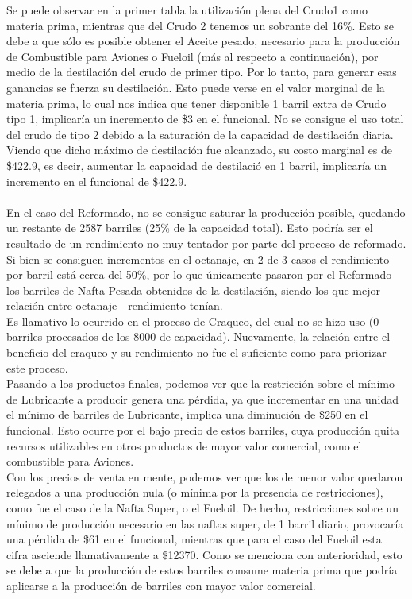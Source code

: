 \documentclass[a4paper,10pt]{article}
\begin{document}
Se puede observar en la primer tabla la utilizaci\'on plena del Crudo1 como materia prima, mientras que del Crudo 2 tenemos un sobrante del 16\%. Esto se debe a que s\'olo es posible obtener el Aceite pesado, necesario para la producci\'on de Combustible para Aviones o Fueloil (m\'as al respecto a continuaci\'on), por medio de la destilaci\'on del crudo de primer tipo. Por lo tanto, para generar esas ganancias se fuerza su destilaci\'on. Esto puede verse en el valor marginal de la materia prima, lo cual nos indica que tener disponible 1 barril extra de Crudo tipo 1, implicar\'ia un incremento de \$3 en el funcional.
No se consigue el uso total del crudo de tipo 2 debido a la saturaci\'on de la capacidad de destilaci\'on diaria.
Viendo que dicho m\'aximo de destilaci\'on fue alcanzado, su costo marginal es de \$422.9, es decir, aumentar la capacidad de destilaci\'o en 1 barril, implicar\'ia un incremento en el funcional de \$422.9. 
\\
\\
En el caso del Reformado, no se consigue saturar la producci\'on posible, quedando un restante de 2587 barriles (25\% de la capacidad total). Esto podr\'ia ser el resultado de un rendimiento no muy tentador por parte del proceso de reformado. Si bien se consiguen incrementos en el octanaje, en 2 de 3 casos el rendimiento por barril está cerca del 50\%, por lo que \'unicamente pasaron por el Reformado los barriles de Nafta Pesada obtenidos de la destilaci\'on, siendo los que mejor relaci\'on entre octanaje - rendimiento ten\'ian.
\\
Es llamativo lo ocurrido en el proceso de Craqueo, del cual no se hizo uso (0 barriles procesados de los 8000 de capacidad). Nuevamente, la relaci\'on entre el beneficio del craqueo y su rendimiento no fue el suficiente como para priorizar este proceso. 
\\

Pasando a los productos finales, podemos ver que la restricci\'on sobre el m\'inimo de Lubricante a producir genera una p\'erdida, ya que incrementar en una unidad el m\'inimo de barriles de Lubricante, implica una diminuci\'on de \$250 en el funcional. Esto ocurre por el bajo precio de estos barriles, cuya producci\'on quita recursos utilizables en otros productos de mayor valor comercial, como el combustible para Aviones.
\\

Con los precios de venta en mente, podemos ver que los de menor valor quedaron relegados a una producci\'on nula (o m\'inima por la presencia de restricciones), como fue el caso de la Nafta Super, o el Fueloil. De hecho, restricciones sobre un m\'inimo de producci\'on necesario en las naftas super, de 1 barril diario, provocar\'ia una p\'erdida de \$61 en el funcional, mientras que para el caso del Fueloil esta cifra asciende llamativamente a \$12370. Como se menciona con anterioridad, esto se debe a que la producci\'on de estos barriles consume materia prima que podr\'ia aplicarse a la producci\'on de barriles con mayor valor comercial. 
\\
\end{document}
